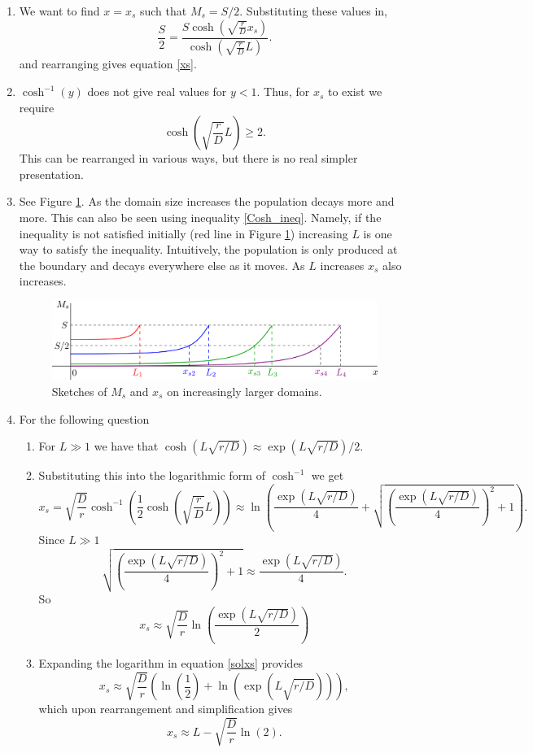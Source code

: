 \documentclass[10pt]{article}
\newcommand{\bb}{\begin{equation}}
\newcommand{\ee}{\end{equation}}
\newcommand{\fig}[1]{Figure \ref{#1}}
\newcommand{\eqn}[1]{equation \eqref{#1}}
\renewcommand{\l}{\left(}
\renewcommand{\r}{\right)}
\begin{document}
\begin{Answ}
\begin{enumerate}
\item We want to find $x=x_s$ such that $M_s=S/2$. Substituting these values in,
\bb
\frac{S}{2}=\frac{S\cosh\l \sqrt{\frac{r}{D}} x_s\r}{\cosh\l \sqrt{\frac{r}{D}} L\r}.
\ee
and rearranging gives \eqn{xs}.

\item $\cosh^{-1}(y)$ does not give real values for $y<1$. Thus, for $x_s$ to exist we require
\bb
\cosh\l\sqrt{\frac{r}{D}}L\r \geq 2.\label{Cosh_ineq}
\ee
This can be rearranged in various ways, but there is no real simpler presentation.

\item See \fig{Gradient_plot_growing}. As the domain size increases the population decays more and more. This can also be seen using inequality \eqref{Cosh_ineq}. Namely, if the inequality is not satisfied initially (red line in \fig{Gradient_plot_growing}) increasing $L$ is one way to satisfy the inequality. Intuitively, the population is only produced at the boundary and decays everywhere else as it moves. As $L$ increases $x_s$ also increases.
\begin{figure}[h!!!tb]
\centering
\includegraphics[width=\textwidth]{../../Pictures/Gradient_plot_growing.png}
\caption{\label{Gradient_plot_growing} Sketches of $M_s$ and $x_s$ on increasingly larger domains.}
\end{figure}
\item For the following question
\begin{enumerate}
\item For $L\gg 1$ we have that $\cosh\l L\sqrt{r/D}\r\approx \exp\l L\sqrt{r/D}\r/2$.
\item  Substituting this into the logarithmic form of $\cosh^{-1}$ we get
\bb
x_s=\sqrt{\frac{D}{r}}\cosh^{-1}\l\frac{1}{2}\cosh\l\sqrt{\frac{r}{D}}L\r \r\approx\ln\l \frac{\exp\l L\sqrt{r/D}\r}{4}+\sqrt{\l\frac{\exp\l L\sqrt{r/D}\r}{4}\r^2+1}\r.
\ee
Since $L\gg 1$
\bb
\sqrt{\l\frac{\exp\l L\sqrt{r/D}\r}{4}\r^2+1}\approx\frac{\exp\l L\sqrt{r/D}\r}{4}.
\ee
So
\bb
x_s\approx \sqrt{\frac{D}{r}}\ln\l\frac{\exp\l L\sqrt{r/D}\r}{2}\r\label{solxs}
\ee
\item Expanding the logarithm in \eqn{solxs} provides
\bb
x_s\approx \sqrt{\frac{D}{r}}\l \ln\l\frac{1}{2}\r+\ln\l\exp\l L\sqrt{r/D}\r\r \r,
\ee
which upon rearrangement and simplification gives
\bb
x_s\approx L- \sqrt{\frac{D}{r}}\ln\l 2\r.\label{Finalxs}
\ee
\end{enumerate}



\end{enumerate}
\end{Answ}
\end{document}
